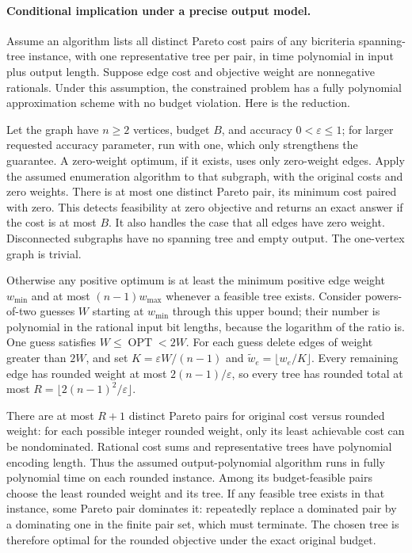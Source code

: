 \documentclass[11pt]{article}
\begin{document}
\paragraph{Conditional implication under a precise output model.}
Assume an algorithm lists all distinct Pareto cost pairs of any
bicriteria spanning-tree instance, with one representative tree per
pair, in time polynomial in input plus output length. Suppose
edge cost and objective weight are nonnegative rationals. Under
this assumption, the constrained problem has a fully polynomial
approximation scheme with no budget violation. Here is the reduction.

Let the graph have $n\ge2$ vertices, budget $B$, and accuracy
$0<\varepsilon\le1$; for larger requested accuracy parameter,
run with one, which only strengthens the guarantee. A zero-weight optimum, if it exists,
uses only zero-weight edges. Apply the assumed enumeration algorithm
to that subgraph, with the original costs and zero weights. There
is at most one distinct Pareto pair, its minimum cost paired with
zero. This detects feasibility at zero objective and returns an
exact answer if the cost is at most $B$. It also handles the
case that all edges have zero weight. Disconnected subgraphs have
no spanning tree and empty output. The one-vertex graph is trivial.

Otherwise any positive optimum is at least the minimum positive
edge weight $w_{\min}$ and at most $(n-1)w_{\max}$ whenever
a feasible tree exists. Consider powers-of-two guesses $W$ starting
at $w_{\min}$ through this upper bound; their number is
polynomial in the rational input bit lengths, because the logarithm
of the ratio is. One guess satisfies $W\le\operatorname{OPT}<2W$.
For each guess delete edges of weight greater than $2W$, and
set $K=\varepsilon W/(n-1)$ and
$\widetilde w_e=\lfloor w_e/K\rfloor$. Every remaining
edge has rounded weight at most $2(n-1)/\varepsilon$, so
every tree has rounded total at most
$R=\lfloor2(n-1)^2/\varepsilon\rfloor$.

There are at most $R+1$ distinct Pareto pairs for original
cost versus rounded weight: for each possible integer rounded
weight, only its least achievable cost can be nondominated. Rational
cost sums and representative trees have polynomial encoding length.
Thus the assumed output-polynomial algorithm runs in fully polynomial
time on each rounded instance. Among its budget-feasible pairs
choose the least rounded weight and its tree. If any feasible tree
exists in that instance, some Pareto pair dominates it: repeatedly
replace a dominated pair by a dominating one in the finite pair
set, which must terminate. The chosen tree is therefore optimal
for the rounded objective under the exact original budget.
\end{document}

